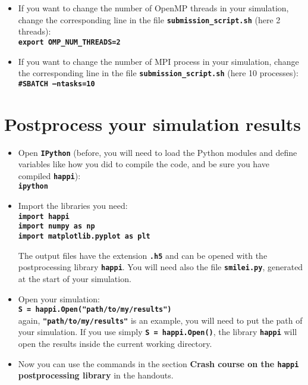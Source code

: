 \documentclass{article}
\newcommand{\commandline}[1]{\texttt{\textbf{#1}}}
\begin{document}
\begin{itemize}
\item If you want to change the number of OpenMP threads in your simulation, change the corresponding line in the file \commandline{submission\_script.sh} (here 2 threads):\\
\commandline{export OMP\_NUM\_THREADS=2}

\item If you want to change the number of MPI process in your simulation, change the corresponding line in the file \commandline{submission\_script.sh} (here 10 processes):\\
\commandline{\#SBATCH --ntasks=10}

\end{itemize}


\section{Postprocess your simulation results}

\begin{itemize}
\item Open \commandline{IPython} (before, you will need to load the Python modules and define variables like how you did to compile the code, and be sure you have compiled \commandline{happi}):\\
\commandline{ipython}

\item Import the libraries you need:\\
\commandline{import happi}\\
\commandline{import numpy as np}\\
\commandline{import matplotlib.pyplot as plt}

The output files have the extension \commandline{.h5} and can be opened with the postprocessing library \commandline{happi}. You will need also the file \commandline{smilei.py}, generated at the start of your simulation.

\item Open your simulation:\\
\commandline{S = happi.Open("path/to/my/results")}\\
again, \commandline{"path/to/my/results"} is an example, you will need to put the path of your simulation. If you use simply \commandline{S = happi.Open()}, the library \commandline{happi} will open the results inside the current working directory.

\item Now you can use the commands in the section \textbf{Crash course on the \commandline{happi} postprocessing library} in the handouts.

\end{itemize}
\end{document}
